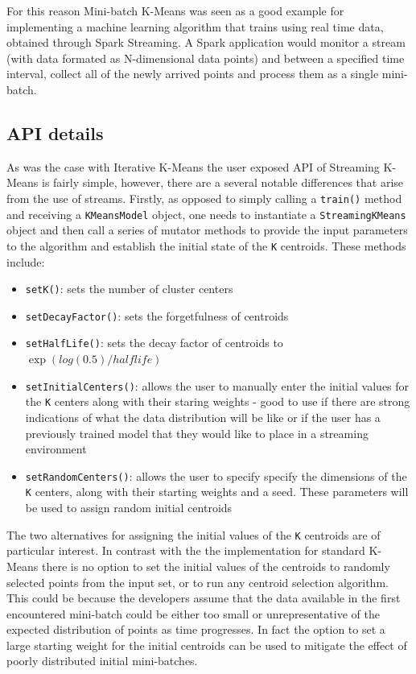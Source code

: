 \documentclass{l4proj}
\begin{document}
For this reason Mini-batch K-Means was seen as a good example for implementing a machine learning algorithm that trains using real time data, obtained through Spark Streaming. A Spark application would monitor a stream (with data formated as N-dimensional data points) and between a specified time interval, collect all of the newly arrived points and process them as a single mini-batch.

\subsection{API details}

As was the case with Iterative K-Means the user exposed API of Streaming K-Means is fairly simple, however, there are a several notable differences that arise from the use of streams. Firstly, as opposed to simply calling a \texttt{train()} method and receiving a \texttt{KMeansModel} object, one needs to instantiate a \texttt{StreamingKMeans} object and then call a series of mutator methods to provide the input parameters to the algorithm and establish the initial state of the \texttt{K} centroids. These methods include:

\begin{itemize}
\item \texttt{setK()}: sets the number of cluster centers
\item \texttt{setDecayFactor()}: sets the forgetfulness of centroids
\item \texttt{setHalfLife()}: sets the decay factor of centroids to $\exp(log(0.5) / halflife)$
\item \texttt{setInitialCenters()}: allows the user to manually enter the initial values for the \texttt{K} centers along with their staring weights - good to use if there are strong indications of what the data distribution will be like or if the user has a previously trained model that they would like to place in a streaming environment
\item \texttt{setRandomCenters()}: allows the user to specify specify the dimensions of the \texttt{K} centers, along with their starting weights and a seed. These parameters will be used to assign random initial centroids
\end{itemize}

The two alternatives for assigning the initial values of the \texttt{K} centroids are of particular interest. In contrast with the the implementation for standard K-Means there is no option to set the initial values of the centroids to randomly selected points from the input set, or to run any centroid selection algorithm. This could be because the developers assume that the data available in the first encountered mini-batch could be either too small or unrepresentative of the expected distribution of points as time progresses. In fact the option to set a large starting weight for the initial centroids can be used to mitigate the effect of poorly distributed initial mini-batches.
\end{document}
